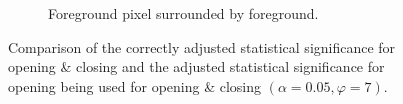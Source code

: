 \begin{figure}[H]
\begin{subfigure}[t]{0.48\linewidth}
		\caption{Foreground pixel surrounded by foreground.}
		\label{fig: alpha0.05_phi7_foreground_free_test}
	\end{subfigure}
	\caption{Comparison of the correctly adjusted statistical significance for opening \& closing and the adjusted statistical significance for opening being used for opening \& closing $(\alpha = 0.05, \varphi = 7)$.}
	\label{fig: alpha0.05_phi7_test}
\end{figure}
